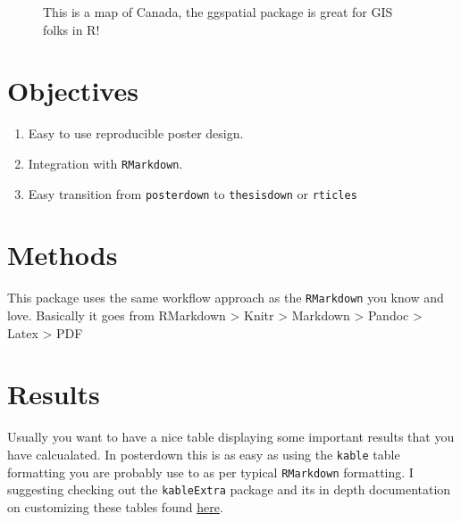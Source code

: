 \documentclass[article,30pt,extrafontsizes]{memoir}
\begin{document}
\begin{adjmulticols*}{3}{10mm}{10mm}
{\begin{figure}
{}

\caption{This is a map of Canada, the ggspatial package is great for GIS folks in R!}\label{fig:unnamed-chunk-2}
\end{figure}

\section{Objectives}\label{objectives}

\large

\begin{enumerate}
\def\labelenumi{\arabic{enumi}.}
\tightlist
\item
  Easy to use reproducible poster design.
\item
  Integration with \texttt{RMarkdown}.
\item
  Easy transition from \texttt{posterdown} to \texttt{thesisdown} or
  \texttt{rticles}
\end{enumerate}

\small

\section{Methods}\label{methods}

This package uses the same workflow approach as the \texttt{RMarkdown}
you know and love. Basically it goes from RMarkdown \textgreater{} Knitr
\textgreater{} Markdown \textgreater{} Pandoc \textgreater{} Latex
\textgreater{} PDF

\section{Results}\label{results}

Usually you want to have a nice table displaying some important results
that you have calcualated. In posterdown this is as easy as using the
\texttt{kable} table formatting you are probably use to as per typical
\texttt{RMarkdown} formatting. I suggesting checking out the
\texttt{kableExtra} package and its in depth documentation on
customizing these tables found
\href{https://haozhu233.github.io/kableExtra/awesome_table_in_pdf.pdf}{here}.


\begin{table}


\end{table}}
\end{adjmulticols*}
\end{document}

